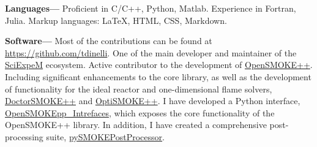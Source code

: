{\bf Languages---}
Proficient in C/C++, Python, Matlab. Experience in Fortran, Julia. Markup
languages: \LaTeX, HTML, CSS, Markdown.


{\bf Software---}
Most of the contributions can be found at
\href{https://github.com/tdinelli}{https://github.com/tdinelli}. One of the main
developer and maintainer of the \href{https://sciexpem.polimi.it/}{SciExpeM} ecosystem.
Active contributor to the development of
\href{https://www.opensmokepp.polimi.it/}{OpenSMOKE++}. Including significant
enhancements to the core library, as well as the development of functionality for the
ideal reactor and one-dimensional flame solvers,
\href{https://www.opensmokepp.polimi.it/}{DoctorSMOKE++} and
\href{https://github.com/burn-research/OptiSMOKE_toolbox}{OptiSMOKE++}. I have developed
a Python interface,
\href{https://github.com/tdinelli/OpenSMOKEpp_Interfaces}{OpenSMOKEpp\_Intrefaces}, which
exposes the core functionality of the OpenSMOKE++ library. In addition, I have created a
comprehensive post-processing suite,
\href{https://github.com/tdinelli/pySMOKEPostProcessor}{pySMOKEPostProcessor}.
